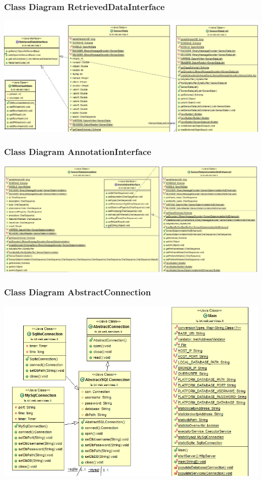 \documentclass{beamer}
\begin{document}
\begin{frame}
\frametitle{Class Diagram RetrievedDataInterface}
\includegraphics[width=1\textwidth]{images/ClassDiagram1.png}
\end{frame}

\begin{frame}
\frametitle{Class Diagram AnnotationInterface}
\includegraphics[width=1\textwidth]{images/annotationinterface.png}
\end{frame}

\begin{frame}
\frametitle{Class Diagram AbstractConnection}
\includegraphics[width=1\textwidth]{images/main.png}
\end{frame}
\end{document}
